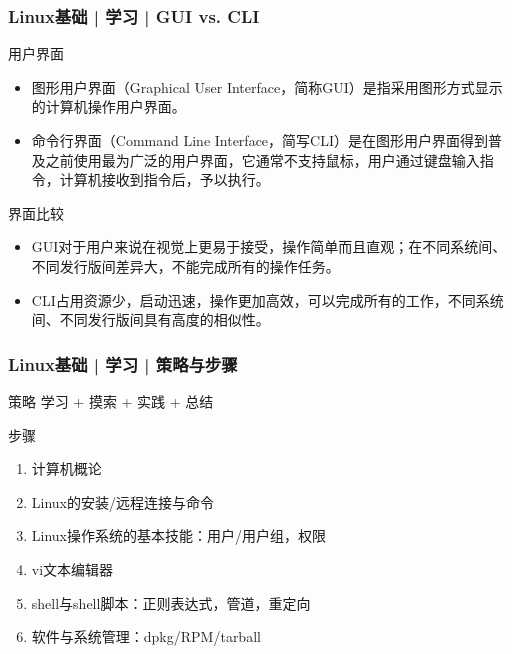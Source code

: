 \begin{frame}
  \frametitle{Linux基础 | 学习 | GUI vs. CLI}
  \begin{block}{\alert{用户界面}}
    \begin{itemize}[<+->]
      \item 图形用户界面（Graphical User Interface，简称GUI）是指采用图形方式显示的计算机操作用户界面。
      \item 命令行界面（Command Line Interface，简写CLI）是在图形用户界面得到普及之前使用最为广泛的用户界面，它通常不支持鼠标，用户通过键盘输入指令，计算机接收到指令后，予以执行。
    \end{itemize}
  \end{block}
  \pause
  \begin{block}{界面比较}
    \begin{itemize}
      \item GUI对于用户来说在视觉上更易于接受，操作简单而且直观；在不同系统间、不同发行版间差异大，不能完成所有的操作任务。
      \item CLI占用资源少，启动迅速，操作更加高效，可以完成所有的工作，不同系统间、不同发行版间具有高度的相似性。
    \end{itemize}
  \end{block}
  \pause
\end{frame}

\begin{frame}
  \frametitle{Linux基础 | 学习 | 策略与步骤}
  \begin{block}{策略}
    学习 + 摸索 + 实践 + 总结
  \end{block}
  \pause
  \begin{block}{步骤}
    \begin{enumerate}[<+->]
      \item 计算机概论
      \item Linux的安装/远程连接与命令
      \item Linux操作系统的基本技能：用户/用户组，权限
      \item vi文本编辑器
      \item shell与shell脚本：正则表达式，管道，重定向
      \item 软件与系统管理：dpkg/RPM/tarball
    \end{enumerate}
  \end{block}
\end{frame}

